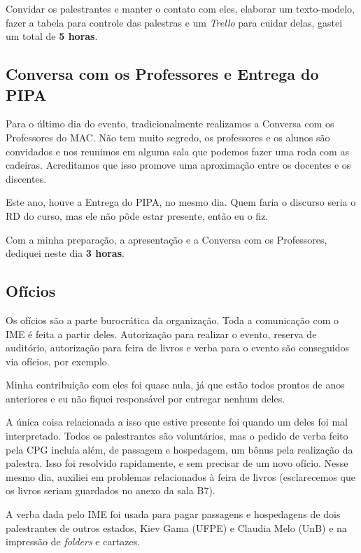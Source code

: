 \documentclass[12pt,letterpaper]{article}
\begin{document}
	Convidar os palestrantes e manter o contato com eles, elaborar um texto-modelo, fazer a tabela para controle das palestras e um \textit{Trello} para cuidar delas, gastei um total de \textbf{5 horas}. 
	
	\subsection{Conversa com os Professores e Entrega do PIPA}
	
	Para o último dia do evento, tradicionalmente realizamos a Conversa com os Professores do MAC. Não tem muito segredo, os professores e os alunos são convidados e nos reunimos em alguma sala que podemos fazer uma roda com as cadeiras. Acreditamos que isso promove uma aproximação entre os docentes e os discentes.
	
	Este ano, houve a Entrega do PIPA, no mesmo dia. Quem faria o discurso seria o RD do curso, mas ele não pôde estar presente, então eu o fiz. 
	
	Com a minha preparação, a apresentação e a Conversa com os Professores, dediquei neste dia \textbf{3 horas}.
	
	\subsection{Ofícios}
	
	Os ofícios são a parte burocrática da organização. Toda a comunicação com o IME é feita a partir deles. Autorização para realizar o evento, reserva de auditório, autorização para feira de livros e verba para o evento são conseguidos via ofícios, por exemplo.
	
	Minha contribuição com eles foi quase nula, já que estão todos prontos de anos anteriores e eu não fiquei responsável por entregar nenhum deles.
	
	A única coisa relacionada a isso que estive presente foi quando um deles foi mal interpretado. Todos os palestrantes são voluntários, mas o pedido de verba feito pela CPG incluía além, de passagem e hospedagem, um bônus pela realização da palestra. Isso foi resolvido rapidamente, e sem precisar de um novo ofício. Nesse mesmo dia, auxiliei em problemas relacionados à feira de livros (esclarecemos que os livros seriam guardados no anexo da sala B7).
	
	A verba dada pelo IME foi usada para pagar passagens e hospedagens de dois palestrantes de outros estados, Kiev Gama (UFPE) e Claudia Melo (UnB) e na impressão de \textit{folders} e cartazes.
	
\end{document}
